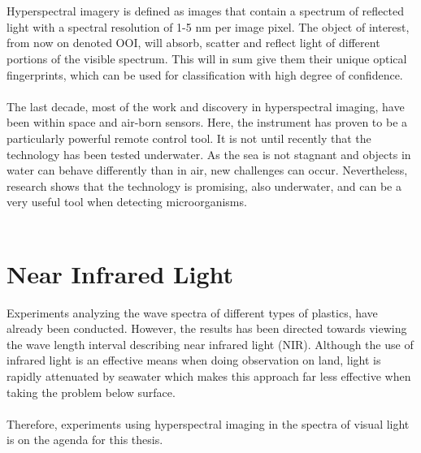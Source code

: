 \\\\
Hyperspectral imagery is defined as images that contain a spectrum of reflected light with a spectral resolution of 1-5 nm per image pixel. The object of interest, from now on denoted OOI, will absorb, scatter and reflect light of different portions of the visible spectrum. This will in sum give them their unique optical fingerprints, which can be used for classification with high degree of confidence.
\\\\
The last decade, most of the work and discovery in hyperspectral imaging, have been within space and air-born sensors. Here, the instrument has proven to be a particularly powerful remote control tool. It is not until recently that the technology has been tested underwater. As the sea is not stagnant and objects in water can behave differently than in air, new challenges can occur. Nevertheless, research shows that the technology is promising, also underwater, and can be a very useful tool when detecting microorganisms.
\\\\

\section{Near Infrared Light}


Experiments analyzing the wave spectra of different types of plastics, have already been conducted. However, the results has been directed towards viewing the wave length interval describing near infrared light (NIR). Although the use of infrared light is an effective means when doing observation on land, light is rapidly attenuated by seawater which makes this approach far less effective when taking the problem below surface.
\\\\
Therefore, experiments using hyperspectral imaging in the spectra of visual light is on the agenda for this thesis. 
\\\\

